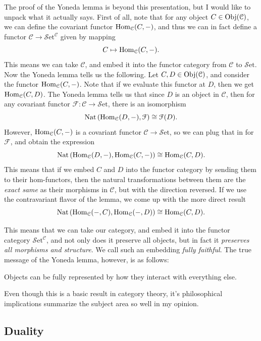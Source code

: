 \documentclass[11pt, letterpaper]{article}
\newcommand{\Set}{\mathcal{S}\mathrm{et}}
\begin{document}
The proof of the Yoneda lemma is beyond this presentation, but I would like to unpack what it actually says. First of all, note that for any object $C\in \operatorname{Obj}(\mathcal{C} ) $, we can define the covariant functor $\operatorname{Hom}_{\mathcal{C} }(C, -) $, and thus we can in fact define a functor $\mathcal{C} \to \Set ^{\mathcal{C} } $ given by mapping
\[
	C\mapsto \operatorname{Hom}_{\mathcal{C} }(C, -) 
.\]
This means we can take $\mathcal{C} $, and embed it into the functor category from $\mathcal{C} $ to $\Set $. Now the Yoneda lemma tells us the following. Let $C,D\in \operatorname{Obj}(\mathcal{C} ) $, and consider the functor $\operatorname{Hom}_{\mathcal{C} }(C, -) $. Note that if we evaluate this functor at $D$, then we get $\operatorname{Hom}_{\mathcal{C} }(C, D) $. The Yoneda lemma tells us that since $D$ is an object in $\mathcal{C} $, then for any covariant functor $\mathcal{F} : \mathcal{C}  \to \Set $, there is an isomorphism
\[
	\operatorname{Nat} \left( \operatorname{Hom}_{\mathcal{C} }(D, -) ,\mathcal{F}  \right) \cong \mathcal{F} (D)
.\]
However, $\operatorname{Hom}_{\mathcal{C} }(C, -) $ is a covariant functor $\mathcal{C} \to \Set $, so we can plug that in for $\mathcal{F} $, and obtain the expression
\[
	\operatorname{Nat} \left( \operatorname{Hom}_{\mathcal{C} }(D, -) ,\operatorname{Hom}_{\mathcal{C} }(C, -)  \right) \cong \operatorname{Hom}_{\mathcal{C} }(C, D) 
.\]
This means that if we embed $C$ and $D$ into the functor category by sending them to their hom-functors, then the natural transformations between them are the \emph{exact same} as their morphisms in $\mathcal{C} $, but with the direction reversed. If we use the contravariant flavor of the lemma, we come up with the more direct result
\[
	\operatorname{Nat} \left( \operatorname{Hom}_{\mathcal{C} }(-, C) ,\operatorname{Hom}_{\mathcal{C} }(-, D)  \right) \cong \operatorname{Hom}_{\mathcal{C} }(C, D) 
.\]

This means that we can take our category, and embed it into the functor category $\Set ^{\mathcal{C} } $, and not only does it preserve all objects, but in fact it \emph{preserves all morphisms and structure}. We call such an embedding \emph{fully faithful}. The true message of the Yoneda lemma, however, is as follows:
\begin{displayquote}
	Objects can be fully represented by how they interact with everything else.
\end{displayquote}
Even though this is a basic result in category theory, it's philosophical implications summarize the subject area so well in my opinion.

\subsection{Duality}
\end{document}
